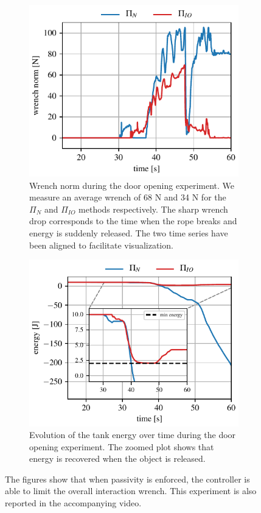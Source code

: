 \begin{figure}[t]
\centering
\begin{subfigure}{\columnwidth}
\centering
    \includegraphics[width=0.7\linewidth]{figures/hardware_experiments/wrench_norm.pdf}
    \caption{Wrench norm during the door opening experiment. We measure an average wrench of 68 N and 34 N for the $\Pi_{N}$ and $\Pi_{IO}$ methods respectively. The sharp wrench drop corresponds to the time when the rope breaks and energy is suddenly released. The two time series have been aligned to facilitate visualization.}
\end{subfigure}
\begin{subfigure}{\columnwidth}
\centering
    \includegraphics[width=0.7\linewidth]{figures/hardware_experiments/energy_tank.pdf}
    \caption{Evolution of the tank energy over time during the door opening experiment. The zoomed plot shows that energy is recovered when the object is released.}
\end{subfigure}
    \caption{The figures show that when passivity is enforced, the controller is able to limit the overall interaction wrench. This experiment is also reported in the accompanying video.}
    \label{fig:passivity_experiment}
\end{figure}


